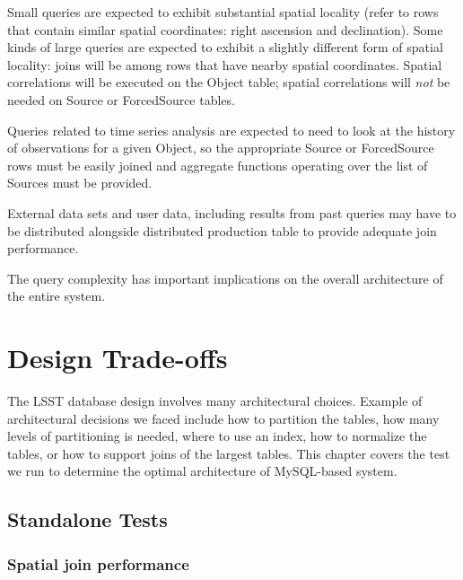\documentclass[DM,lsstdraft,toc]{lsstdoc}
\begin{document}
Small queries are expected to exhibit substantial spatial locality
(refer to rows that contain similar spatial coordinates: right ascension
and declination). Some kinds of large queries are expected to exhibit a
slightly different form of spatial locality: joins will be among rows
that have nearby spatial coordinates. Spatial correlations will be
executed on the Object table; spatial correlations will \emph{not} be
needed on Source or ForcedSource tables.

Queries related to time series analysis are expected to need to look at
the history of observations for a given Object, so the appropriate
Source or ForcedSource rows must be easily joined and aggregate
functions operating over the list of Sources must be provided.

External data sets and user data, including results from past queries
may have to be distributed alongside distributed production table to
provide adequate join performance.

The query complexity has important implications on the overall
architecture of the entire system.

\section{Design Trade-offs}\label{design-trade-offs}

The LSST database design involves many architectural choices. Example of
architectural decisions we faced include how to partition the tables,
how many levels of partitioning is needed, where to use an index, how to
normalize the tables, or how to support joins of the largest tables.
This chapter covers the test we run to determine the optimal
architecture of MySQL-based system.

\subsection{Standalone Tests}\label{standalone-tests}

\subsubsection{Spatial join performance}\label{spatial-join-performance}
\end{document}
